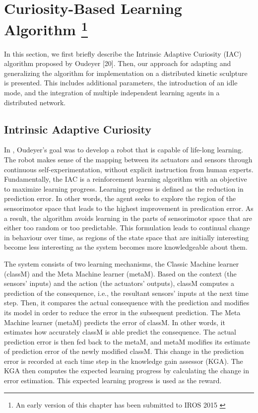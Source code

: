 \chapter[Curiosity-Based Learning Algorithm]
{Curiosity-Based Learning Algorithm \footnote{An early version of this chapter has been submitted to IROS 2015
		\cite{Chan2015} }} 
		\label{chap:cbla}
 
In this section, we first briefly describe the Intrinsic Adaptive Curiosity (IAC) algorithm proposed by Oudeyer [20]. Then, our approach for adapting and generalizing the algorithm for implementation on a distributed kinetic sculpture is presented. This includes additional parameters, the introduction of an idle mode, and the integration of multiple independent learning agents in a distributed network. 

\section{Intrinsic Adaptive Curiosity}

In \cite{Oudeyer2007}, Oudeyer's goal was to develop a robot that is capable of life-long learning. The robot makes sense of the mapping between its actuators and sensors through continuous self-experimentation, without explicit instruction from human experts. Fundamentally, the IAC is a reinforcement learning algorithm with an objective to maximize learning progress. Learning progress is defined as the reduction in prediction error. In other words, the agent seeks to explore the region of the sensorimotor space that leads to the highest improvement in predication error. As a result, the algorithm avoids learning in the parts of sensorimotor space that are either too random or too predictable. This formulation leads to continual change in behaviour over time, as regions of the state space that are initially interesting become less interesting as the system becomes more knowledgeable about them. 
 
The system consists of two learning mechanisms, the Classic Machine learner (classM) and the Meta Machine learner (metaM).  Based on the context (the sensors' inputs) and the action (the actuators' outputs), classM computes a prediction of the consequence, i.e., the resultant sensors' inputs at the next time step. Then, it compares the actual consequence with the prediction and modifies its model in order to reduce the error in the subsequent prediction. The Meta Machine learner (metaM) predicts the error of classM. In other words, it estimates how accurately classM is able predict the consequence. The actual prediction error is then fed back to the metaM, and metaM modifies its estimate of prediction error of the newly modified classM. This change in the prediction error is recorded at each time step in the knowledge gain assessor (KGA). The KGA then computes the expected learning progress by calculating the change in error estimation.  This expected learning progress is used as the reward. 


